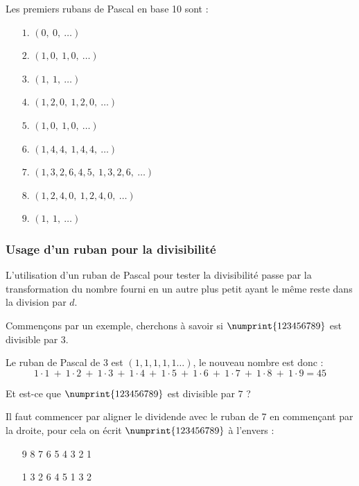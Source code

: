 \documentclass[a4paper, twoside]{article}
\begin{document}
	Les premiers rubans de Pascal en base 10 sont :

	\begin{itemize}

		\item[$1.$] $(0,~0,~\dots)$ 
		\item[$2.$] $(1, 0,~1, 0,~\dots)$ 
		\item[$3.$] $(1,~1,~\dots)$ 
		\item[$4.$] $(1, 2, 0,~1, 2, 0,~\dots)$ 
		\item[$5.$] $(1, 0,~1, 0,~\dots)$ 
		\item[$6.$] $(1, 4, 4,~1, 4, 4,~\dots)$ 
		\item[$7.$] $(1, 3, 2, 6, 4, 5,~1, 3, 2, 6,~\dots)$ 
		\item[$8.$] $(1, 2, 4, 0,~1, 2, 4, 0,~\dots)$ 
		\item[$9.$] $(1,~1,~\dots)$ 
		
	\end{itemize}

	\vfill



	\subsubsection*{Usage d’un ruban pour la divisibilité}\label{usage_ruban}
		L'utilisation d'un ruban de Pascal pour tester la divisibilité passe par la transformation du nombre fourni en un autre plus petit ayant le même reste dans la division par $d$.
		
		Commençons par un exemple, cherchons à savoir si $\numprint{123456789}$ est divisible par $3$.
		
		Le ruban de Pascal de $3$ est $(1, 1, 1, 1, 1\dots)$, le nouveau nombre est donc :
		\vspace{-1 mm}
		$$1 \cdot 1~+~1 \cdot 2~+~1 \cdot 3~+~1 \cdot 4~+~1 \cdot 5~+~1 \cdot 6~+~1 \cdot 7~+~1 \cdot 8~+~1 \cdot 9 = 45$$

	\vfill

	\newpage




		Et est-ce que $\numprint{123456789}$ est divisible par $7$ ?
		
		Il faut commencer par aligner le dividende avec le ruban de 7 en commençant par la droite, pour cela on écrit $\numprint{123456789}$ à l'envers :
		
	\begin{itemize}
		\item[] 9 8 7 6 5 4 3 2 1 
		\item[] 1 3 2 6 4 5 1 3 2
	\end{itemize}	
		
\end{document}
